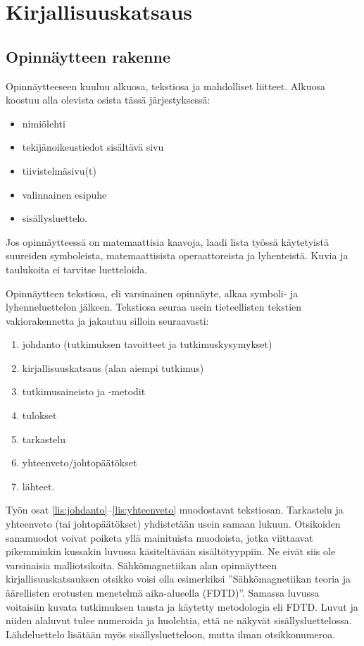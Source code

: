 \documentclass[finnish, 12pt, a4paper, elec, utf8, a-2b, online]{aaltothesis}
\begin{document}
\clearpage

\section{Kirjallisuuskatsaus}

\subsection{Opinnäytteen rakenne}

Opinnäytteeseen kuuluu alkuosa, tekstiosa ja mahdolliset liitteet. Alkuosa 
koostuu alla olevista osista tässä järjestyksessä:
\begin{itemize}
	\item nimiölehti
	\item tekijänoikeustiedot sisältävä sivu 
	\item tiivistelmäsivu(t) 
	\item valinnainen esipuhe 
	\item sisällysluettelo.
\end{itemize}
Jos opinnäytteessä on matemaattisia kaavoja, laadi lista työssä käytetyistä 
suureiden symboleista, matemaattisista operaattoreista ja lyhenteistä.  Kuvia ja 
taulukoita ei tarvitse luetteloida.

Opinnäytteen tekstiosa, eli varsinainen opinnäyte, alkaa symboli- ja 
lyhenneluettelon jälkeen. Tekstiosa seuraa usein tieteellisten tekstien 
vakiorakennetta ja jakautuu silloin seuraavasti:
\begin{enumerate}
	\item \label{lis:johdanto}johdanto (tutkimuksen tavoitteet ja 
	  tutkimuskysymykset)
	\item kirjallisuuskatsaus (alan aiempi tutkimus)
	\item tutkimusaineisto ja -metodit
	\item tulokset
	\item tarkastelu
	\item \label{lis:yhteenveto}yhteenveto/johtopäätökset
	\item lähteet.
\end{enumerate}
Työn osat \ref{lis:johdanto}--\ref{lis:yhteenveto} muodostavat tekstiosan. 
Tarkastelu ja yhteenveto (tai johtopäätökset) yhdistetään usein samaan lukuun. 
Otsikoiden sanamuodot voivat poiketa yllä mainituista muodoista, jotka 
viittaavat pikemminkin kussakin luvussa käsiteltävään sisältötyyppiin. Ne eivät 
siis ole varsinaisia malliotsikoita. Sähkömagnetiikan alan opinnäytteen 
kirjallisuuskatsauksen otsikko voisi olla esimerkiksi ”Sähkömagnetiikan teoria 
ja äärellisten erotusten menetelmä aika-alueella (FDTD)”. Samassa luvussa 
voitaisiin kuvata tutkimuksen tausta ja käytetty metodologia eli FDTD. Luvut ja 
niiden alaluvut tulee numeroida ja huolehtia, että ne näkyvät 
sisällysluettelossa. Lähdeluettelo lisätään myös sisällysluetteloon, mutta ilman 
otsikkonumeroa.
\end{document}
